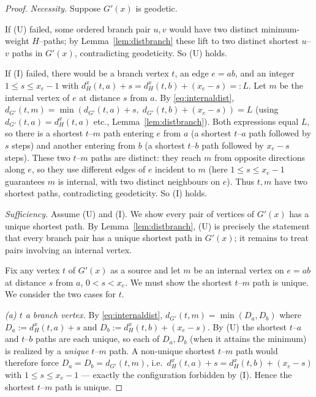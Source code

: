\documentclass{amsart}
\theoremstyle{definition}
\begin{document}
\begin{proof}
\emph{Necessity.} Suppose $G'(x)$ is geodetic.

If (U) failed, some ordered branch pair $u,v$ would have two distinct
minimum-weight $H$--paths; by Lemma~\ref{lem:distbranch} these lift to two
distinct shortest $u$--$v$ paths in $G'(x)$, contradicting geodeticity. So (U)
holds.

If (I) failed, there would be a branch vertex $t$, an edge $e=ab$, and an integer
$1\le s\le x_e-1$ with $d^x_H(t,a)+s=d^x_H(t,b)+(x_e-s)=:L$. Let $m$ be the
internal vertex of $e$ at distance $s$ from $a$. By \eqref{eq:internaldist},
$d_{G'}(t,m)=\min(d_{G'}(t,a)+s,\;d_{G'}(t,b)+(x_e-s))=L$ (using
$d_{G'}(t,a)=d^x_H(t,a)$ etc., Lemma~\ref{lem:distbranch}). Both expressions
equal $L$, so there is a shortest $t$--$m$ path entering $e$ from $a$ (a shortest
$t$--$a$ path followed by $s$ steps) and another entering from $b$ (a shortest
$t$--$b$ path followed by $x_e-s$ steps). These two $t$--$m$ paths are distinct:
they reach $m$ from opposite directions along $e$, so they use different edges of
$e$ incident to $m$ (here $1\le s\le x_e-1$ guarantees $m$ is internal, with two
distinct neighbours on $e$). Thus $t,m$ have two shortest paths, contradicting
geodeticity. So (I) holds.

\smallskip
\emph{Sufficiency.} Assume (U) and (I). We show every pair of vertices of
$G'(x)$ has a unique shortest path. By Lemma~\ref{lem:distbranch}, (U) is
precisely the statement that every branch pair has a unique shortest path in
$G'(x)$; it remains to treat pairs involving an internal vertex.

Fix any vertex $t$ of $G'(x)$ as a source and let $m$ be an internal vertex on
$e=ab$ at distance $s$ from $a$, $0<s<x_e$. We must show the shortest $t$--$m$
path is unique. We consider the two cases for $t$.

\emph{(a) $t$ a branch vertex.} By \eqref{eq:internaldist},
$d_{G'}(t,m)=\min(D_a,D_b)$ where $D_a:=d^x_H(t,a)+s$ and $D_b:=d^x_H(t,b)+(x_e-s)$.
By (U) the shortest $t$--$a$ and $t$--$b$ paths are each unique, so each of $D_a,D_b$
(when it attains the minimum) is realized by a \emph{unique} $t$--$m$ path. A
non-unique shortest $t$--$m$ path would therefore force $D_a=D_b=d_{G'}(t,m)$,
i.e.\ $d^x_H(t,a)+s=d^x_H(t,b)+(x_e-s)$ with $1\le s\le x_e-1$ --- exactly the
configuration forbidden by (I). Hence the shortest $t$--$m$ path is unique.


\end{proof}
\end{document}
